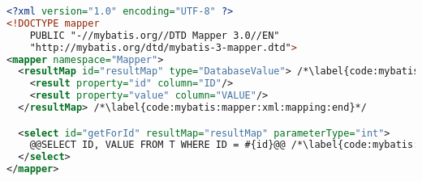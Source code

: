 
\begin{lstlisting}[language=XML, morekeywords={mapper,resultMap,result,select}, caption={MyBatis XML mapper definition}, label={code:mybatis:mapper:xml}]
<?xml version="1.0" encoding="UTF-8" ?>
<!DOCTYPE mapper
    PUBLIC "-//mybatis.org//DTD Mapper 3.0//EN"
    "http://mybatis.org/dtd/mybatis-3-mapper.dtd">
<mapper namespace="Mapper">
  <resultMap id="resultMap" type="DatabaseValue"> /*\label{code:mybatis:mapper:xml:mapping:begin}*/
    <result property="id" column="ID"/>
    <result property="value" column="VALUE"/>
  </resultMap> /*\label{code:mybatis:mapper:xml:mapping:end}*/

  <select id="getForId" resultMap="resultMap" parameterType="int">
    @@SELECT ID, VALUE FROM T WHERE ID = #{id}@@ /*\label{code:mybatis:mapper:xml:query}*/
  </select>
</mapper>
\end{lstlisting}
